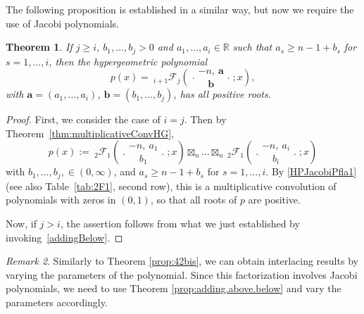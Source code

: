 \documentclass[reqno,11pt]{amsart}
\newtheorem{theorem}{Theorem}[section]
\theoremstyle{remark}
\newtheorem{remark}[theorem]{Remark}
\newcommand{\rr}{\mathbb{R}}
\newcommand*\pFq[5]{%
 {\ }_{#1}{\mathcal F}_{#2}{\left(\genfrac..{0pt}{}{#3}{#4};#5\right)}%
}
\begin{document}
The following proposition is established in a similar way, but now we require the use of Jacobi polynomials.
\begin{theorem} \label{prop:42}
If $j\geq i$, $b_1,\dots,b_j > 0$ and $a_1,\dots,a_{i}\in \rr$ such that $a_s\geq n-1+b_s$ for $s=1,\dots,i$, then the hypergeometric polynomial 
$$p(x)=
\pFq{i+1}{j}{-n,\ \bm a}{ \bm b}{x} ,
$$
with $\bm a = \left( a_1,\dots,a_{i} \right)$, $\bm b = \left( b_1,\dots,b_{j} \right)$, 
has all positive roots.
\end{theorem}
\begin{proof}
First, we consider the case of $i=j$. Then by Theorem~\ref{thm:multiplicativeConvHG}, 
$$
p(x):= \pFq{2}{1}{-n,\  a_1}{ b_{1}}{x} \boxtimes_n  \dots \boxtimes_n \pFq{2}{1}{-n,\  a_i}{ b_{i}}{x} 
$$
with $b_1,\dots,b_j,\in (0,\infty)$, and $a_s\geq n-1+b_s$ for $s=1,\dots,i$. By \eqref{HPJacobiPfla1} (see also Table~\ref{tab:2F1}, second row), this is a multiplicative convolution of polynomials with zeros in $(0,1)$, so that all roots of $p$ are positive.

Now, if $j>i$, the assertion follows from what we just established by invoking~\eqref{addingBelow}. 
\end{proof}
\begin{remark}
Similarly to Theorem \ref{prop:42bis}, we can obtain interlacing results by varying the parameters of the polynomial. Since this factorization involves Jacobi polynomials, we need to use Theorem \ref{prop:adding.above.below} and vary the parameters accordingly. 
\end{remark}
\end{document}
